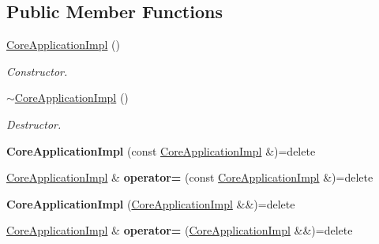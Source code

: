 \subsection*{Public Member Functions}
\begin{DoxyCompactItemize}
\item 
\hyperlink{class_mdt_1_1_core_application_impl_ab97b101b57a2fa8410e39b940e022c4c}{Core\+Application\+Impl} ()
\begin{DoxyCompactList}\small\item\em Constructor. \end{DoxyCompactList}\item 
\hyperlink{class_mdt_1_1_core_application_impl_aa17f799e5d756ca8c5a89196fcbd8e90}{$\sim$\+Core\+Application\+Impl} ()
\begin{DoxyCompactList}\small\item\em Destructor. \end{DoxyCompactList}\item 
{\bfseries Core\+Application\+Impl} (const \hyperlink{class_mdt_1_1_core_application_impl}{Core\+Application\+Impl} \&)=delete\hypertarget{class_mdt_1_1_core_application_impl_a0d5805c4960bdc06587f1a8025732210}{}\label{class_mdt_1_1_core_application_impl_a0d5805c4960bdc06587f1a8025732210}

\item 
\hyperlink{class_mdt_1_1_core_application_impl}{Core\+Application\+Impl} \& {\bfseries operator=} (const \hyperlink{class_mdt_1_1_core_application_impl}{Core\+Application\+Impl} \&)=delete\hypertarget{class_mdt_1_1_core_application_impl_aa7670b4be70a835cc50f78711f1661ae}{}\label{class_mdt_1_1_core_application_impl_aa7670b4be70a835cc50f78711f1661ae}

\item 
{\bfseries Core\+Application\+Impl} (\hyperlink{class_mdt_1_1_core_application_impl}{Core\+Application\+Impl} \&\&)=delete\hypertarget{class_mdt_1_1_core_application_impl_ad8ffe3e8f1fc148847599f421d19ba12}{}\label{class_mdt_1_1_core_application_impl_ad8ffe3e8f1fc148847599f421d19ba12}

\item 
\hyperlink{class_mdt_1_1_core_application_impl}{Core\+Application\+Impl} \& {\bfseries operator=} (\hyperlink{class_mdt_1_1_core_application_impl}{Core\+Application\+Impl} \&\&)=delete\hypertarget{class_mdt_1_1_core_application_impl_a4d8837b1128fcdbf43076150751a1ea4}{}\label{class_mdt_1_1_core_application_impl_a4d8837b1128fcdbf43076150751a1ea4}


\end{DoxyCompactItemize}
